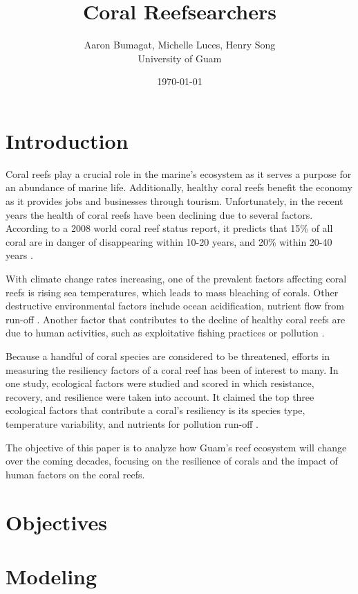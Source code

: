\documentclass[12pt]{article}
\title{Coral Reefsearchers}
\author{Aaron Bumagat, Michelle Luces, Henry Song\\University of Guam}
\date{\today}
\begin{document}
\maketitle

\section{Introduction}
Coral reefs play a crucial role in the marine's ecosystem as it serves a purpose for an abundance of marine life. Additionally, healthy coral reefs benefit the economy as it provides jobs and businesses through tourism. Unfortunately, in the recent years the health of coral reefs have been declining due to several factors. According to a 2008 world coral reef status report, it predicts that 15\% of all coral are in danger of disappearing within 10-20 years, and 20\% within 20-40 years \cite{quintero_machuca_cotto_bradley_ríos-soto_2016}. 

With climate change rates increasing, one of the prevalent factors affecting coral reefs is rising sea temperatures, which leads to mass bleaching of corals. Other destructive environmental factors include ocean acidification, nutrient flow from run-off \cite{quintero_machuca_cotto_bradley_ríos-soto_2016}. Another factor that contributes to the decline of healthy coral reefs are due to human activities, such as exploitative fishing practices or pollution \cite{mathanalysis}. 

Because a handful of coral species are considered to be threatened, efforts in measuring the resiliency factors of a coral reef has been of interest to many. In one study, ecological factors were studied and scored in which resistance, recovery, and resilience were taken into account. It claimed the top three ecological factors that contribute a coral's resiliency is its species type, temperature variability, and nutrients for pollution run-off \cite{Riegl_Purkis_Model}. 

The objective of this paper is to analyze how Guam's reef ecosystem will change over the coming decades, focusing on the resilience of corals and the impact of human factors on the coral reefs. 

\section{Objectives}


\section{Modeling}
\end{document}
